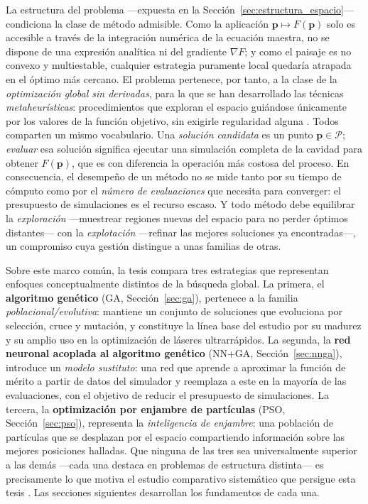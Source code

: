 La estructura del problema —expuesta en la Sección~\ref{sec:estructura_espacio}—
condiciona la clase de método admisible. Como la aplicación
$\mathbf{p}\mapsto F(\mathbf{p})$ solo es accesible a través de la integración
numérica de la ecuación maestra, no se dispone de una expresión analítica ni del
gradiente $\nabla F$; y como el paisaje es no convexo y multiestable, cualquier
estrategia puramente local quedaría atrapada en el óptimo más cercano. El problema
pertenece, por tanto, a la clase de la \emph{optimización global sin derivadas},
para la que se han desarrollado las técnicas \emph{metaheurísticas}: procedimientos
que exploran el espacio guiándose únicamente por los valores de la función objetivo,
sin exigirle regularidad alguna \cite{BruntonKutz2022}. Todos comparten un mismo
vocabulario. Una \emph{solución candidata} es un punto $\mathbf{p}\in\mathcal{P}$;
\emph{evaluar} esa solución significa ejecutar una simulación completa de la cavidad
para obtener $F(\mathbf{p})$, que es con diferencia la operación más costosa del
proceso. En consecuencia, el desempeño de un método no se mide tanto por su tiempo
de cómputo como por el \emph{número de evaluaciones} que necesita para converger:
el presupuesto de simulaciones es el recurso escaso. Y todo método debe equilibrar
la \emph{exploración} —muestrear regiones nuevas del espacio para no perder óptimos
distantes— con la \emph{explotación} —refinar las mejores soluciones ya
encontradas—, un compromiso cuya gestión distingue a unas familias de otras.

Sobre este marco común, la tesis compara tres estrategias que representan enfoques
conceptualmente distintos de la búsqueda global. La primera, el \textbf{algoritmo
genético} (GA, Sección~\ref{sec:ga}), pertenece a la familia
\emph{poblacional\-/evolutiva}: mantiene un conjunto de soluciones que evoluciona
por selección, cruce y mutación, y constituye la línea base del estudio por su
madurez y su amplio uso en la optimización de láseres ultrarrápidos. La segunda, la
\textbf{red neuronal acoplada al algoritmo genético} (NN+GA,
Sección~\ref{sec:nnga}), introduce un \emph{modelo sustituto}: una red que aprende a
aproximar la función de mérito a partir de datos del simulador y reemplaza a este en
la mayoría de las evaluaciones, con el objetivo de reducir el presupuesto de
simulaciones. La tercera, la \textbf{optimización por enjambre de partículas} (PSO,
Sección~\ref{sec:pso}), representa la \emph{inteligencia de enjambre}: una población
de partículas que se desplazan por el espacio compartiendo información sobre las
mejores posiciones halladas. Que ninguna de las tres sea universalmente superior a
las demás —cada una destaca en problemas de estructura distinta— es precisamente lo
que motiva el estudio comparativo sistemático que persigue esta tesis
\cite{Genty2021}. Las secciones siguientes desarrollan los fundamentos de cada una.


